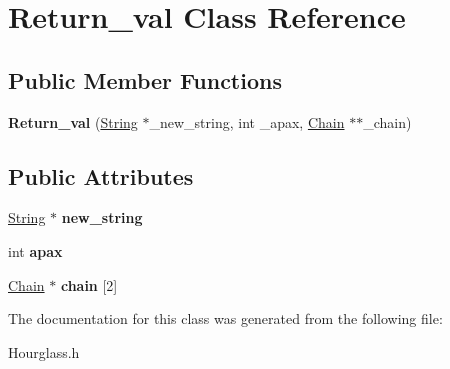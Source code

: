 \hypertarget{class_return__val}{}\section{Return\+\_\+val Class Reference}
\label{class_return__val}
\subsection*{Public Member Functions}
\begin{DoxyCompactItemize}
\item 
\mbox{\label{class_return__val_af9853b28bf71a7d69b38f59e92c3c967}} 
{\bfseries Return\+\_\+val} (\mbox{\hyperlink{class_string}{String}} $\ast$\+\_\+new\+\_\+string, int \+\_\+apax, \mbox{\hyperlink{class_chain}{Chain}} $\ast$$\ast$\+\_\+chain)
\end{DoxyCompactItemize}
\subsection*{Public Attributes}
\begin{DoxyCompactItemize}
\item 
\mbox{\label{class_return__val_af214c792a8a3ee5311c9af590d07bf91}} 
\mbox{\hyperlink{class_string}{String}} $\ast$ {\bfseries new\+\_\+string}
\item 
\mbox{\label{class_return__val_a5360400416b3e553a7cb45c0fc5f9e67}} 
int {\bfseries apax}
\item 
\mbox{\label{class_return__val_adc81ef064d42e7a57fe914b1c1e7d29f}} 
\mbox{\hyperlink{class_chain}{Chain}} $\ast$ {\bfseries chain} \mbox{[}2\mbox{]}
\end{DoxyCompactItemize}


The documentation for this class was generated from the following file\+:\begin{DoxyCompactItemize}
\item 
Hourglass.\+h\end{DoxyCompactItemize}
